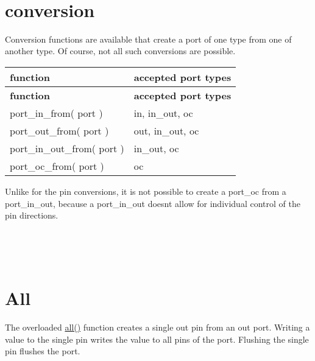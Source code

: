 \begin{DoxyCodeInclude}
\end{DoxyCodeInclude}
 ~\newline
 

\hypertarget{ports_port-conversion}{}\section{conversion}\label{ports_port-conversion}
Conversion functions are available that create a port of one type from one of another type. Of course, not all such conversions are possible.

\tabulinesep=1mm
\begin{longtabu} spread 0pt [c]{*{2}{|X[-1]}|}
\hline
\rowcolor{\tableheadbgcolor}\textbf{ function }&\textbf{ accepted port types  }\\
\endfirsthead
\hline
\endfoot
\hline
\rowcolor{\tableheadbgcolor}\textbf{ function }&\textbf{ accepted port types  }\\
\endhead
port\+\_\+in\+\_\+from( port ) &in, in\+\_\+out, oc \\
port\+\_\+out\+\_\+from( port ) &out, in\+\_\+out, oc \\
port\+\_\+in\+\_\+out\+\_\+from( port ) &in\+\_\+out, oc \\
port\+\_\+oc\+\_\+from( port ) &oc \\
\end{longtabu}
Unlike for the pin conversions, it is not possible to create a port\+\_\+oc from a port\+\_\+in\+\_\+out, because a port\+\_\+in\+\_\+out doesn\textquotesingle{}t allow for individual control of the pin directions.

~\newline



\begin{DoxyCodeInclude}
\end{DoxyCodeInclude}
 ~\newline
 

\hypertarget{ports_port-all}{}\section{All}\label{ports_port-all}
The overloaded \hyperlink{structxy_af0ac2823653fbb02e47de4315fb20a49}{all()} function creates a single out pin from an out port. Writing a value to the single pin writes the value to all pins of the port. Flushing the single pin flushes the port.

~\newline
 